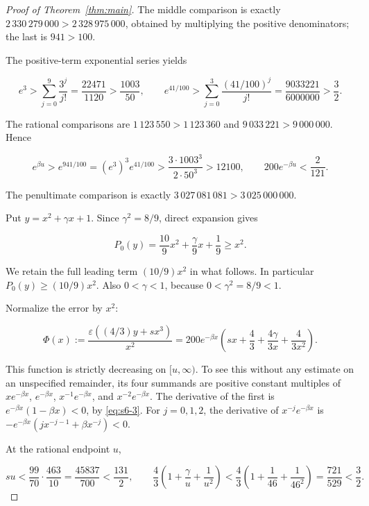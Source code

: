 \documentclass[10pt]{article}
\numberwithin{equation}{section}
\theoremstyle{remark}
\begin{document}
\begin{proof}[Proof of Theorem~\ref{thm:main}]
The middle comparison is exactly
\(2\,330\,279\,000>2\,328\,975\,000\), obtained by multiplying the positive
denominators; the last is \(941>100\).

The positive-term exponential series yields

\[
e^3>\sum_{j=0}^{9}\frac{3^j}{j!}
=\frac{22471}{1120}>\frac{1003}{50},
\qquad
e^{41/100}>
\sum_{j=0}^{3}\frac{(41/100)^j}{j!}
=\frac{9033221}{6000000}>\frac32.
\]

The rational comparisons are \(1\,123\,550>1\,123\,360\) and
\(9\,033\,221>9\,000\,000\). Hence

\begin{equation}
e^{\beta u}>e^{941/100}
=(e^3)^3e^{41/100}
>\frac{3\cdot1003^3}{2\cdot50^3}>12100,
\qquad
200e^{-\beta u}<\frac{2}{121}.
\label{eq:s6-4}
\end{equation}

The penultimate comparison is exactly
\(3\,027\,081\,081>3\,025\,000\,000\).

Put \(y=x^2+\gamma x+1\). Since \(\gamma^2=8/9\), direct expansion gives

\begin{equation}
P_0(y)=\frac{10}{9}x^2+\frac{\gamma}{9}x+\frac19\ge x^2.
\label{eq:s6-5}
\end{equation}

We retain the full leading term \((10/9)x^2\) in what follows. In
particular \(P_0(y)\ge(10/9)x^2\). Also \(0<\gamma<1\), because
\(0<\gamma^2=8/9<1\).

Normalize the error by \(x^2\):

\[
\Phi(x):=\frac{\varepsilon((4/3)y+sx^3)}{x^2}
=200e^{-\beta x}
\left(sx+\frac43+\frac{4\gamma}{3x}+\frac{4}{3x^2}\right).
\]

This function is strictly decreasing on \([u,\infty)\). To see this
without any estimate on an unspecified remainder, its four summands are
positive constant multiples of \(xe^{-\beta x}\), \(e^{-\beta x}\),
\(x^{-1}e^{-\beta x}\), and \(x^{-2}e^{-\beta x}\). The derivative of the
first is \(e^{-\beta x}(1-\beta x)<0\), by \eqref{eq:s6-3}. For
\(j=0,1,2\), the derivative of \(x^{-j}e^{-\beta x}\) is
\(-e^{-\beta x}(j x^{-j-1}+\beta x^{-j})<0\).

At the rational endpoint \(u\),

\[
su<\frac{99}{70}\cdot\frac{463}{10}
=\frac{45837}{700}<\frac{131}{2},
\qquad
\frac43\left(1+\frac\gamma u+\frac1{u^2}\right)
<\frac43\left(1+\frac1{46}+\frac1{46^2}\right)
=\frac{721}{529}<\frac32.
\]


\end{proof}
\end{document}
